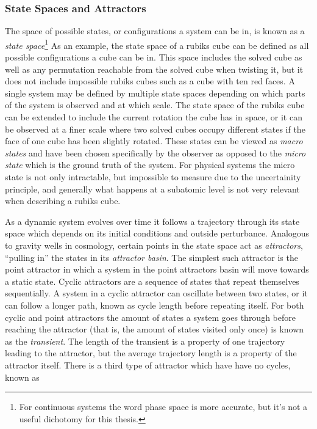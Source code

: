 \subsubsection{State Spaces and Attractors}
The space of possible states, or configurations a system can be in, is known as a
\emph{state space}\footnote{For continuous systems the word phase space is more
  accurate, but it's not a useful dichotomy for this thesis.}
As an example, the state space of a rubiks cube can be defined as all possible
configurations a cube can be in.
This space includes the solved cube as well as any permutation reachable from
the solved cube when twisting it, but it does not include impossible rubiks
cubes such as a cube with ten red faces.
A single system may be defined by multiple state spaces depending on which parts
of the system is observed and at which scale.
The state space of the rubiks cube can be extended to include the current
rotation the cube has in space, or it can be observed at a finer scale where two
solved cubes occupy different states if the face of one cube has been slightly
rotated.
These states can be viewed as \emph{macro states} and have been chosen specifically
by the observer as opposed to the \emph{micro state} which is the ground truth
of the system\cite{JENSEN_ASI}.
For physical systems the micro state is not only intractable, but impossible to
measure due to the uncertainity principle, and generally what happens at a
subatomic level is not very relevant when describing a rubiks cube.\par
%
As a dynamic system evolves over time it follows a trajectory through its state
space which depends on its initial conditions and outside perturbance.
Analogous to gravity wells in cosmology, certain points in the state space act
as \emph{attractors}, ``pulling in'' the states in its \emph{attractor basin}.
The simplest such attractor is the point attractor in which a system in the
point attractors basin will move towards a static state.
Cyclic attractors are a sequence of states that repeat themselves sequentially.
A system in a cyclic attractor can oscillate between two states, or it can
follow a longer path, known as cycle length before repeating itself.
For both cyclic and point attractors the amount of states a system goes through
before reaching the attractor (that is, the amount of states visited only once)
is known as the \emph{transient}.
The length of the transient is a property of one trajectory leading to the
attractor, but the average trajectory length is a property of the attractor
itself.
There is a third type of attractor which have have no cycles, known as
